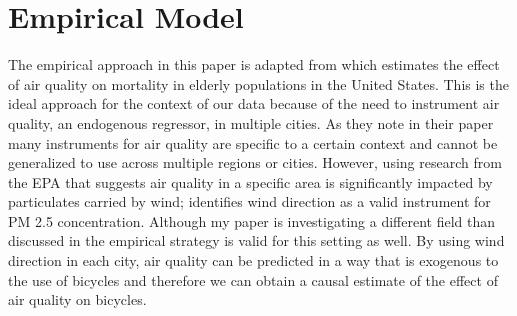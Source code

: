 \documentclass[12pt,letter paper]{article}
\begin{document}
\section{Empirical Model}

The empirical approach in this paper is adapted from \cite{deryungina2016mortality} which estimates the effect of air quality on mortality in elderly populations in the United States.  This is the ideal approach for the context of our data because of the need to instrument air quality, an endogenous regressor, in multiple cities.  As they note in their paper many instruments for air quality are specific to a certain context and cannot be generalized to use across multiple regions or cities.  However, using research from the EPA that suggests air quality in a specific area is significantly impacted by particulates carried by wind; \cite{deryungina2016mortality} identifies wind direction as a valid instrument for PM 2.5 concentration.  Although my paper is investigating a different field than discussed in \cite{deryungina2016mortality} the empirical strategy is valid for this setting as well.  By using wind direction in each city, air quality can be predicted in a way that is exogenous to the use of bicycles and therefore we can obtain a causal estimate of the effect of air quality on bicycles.  \\
\end{document}
